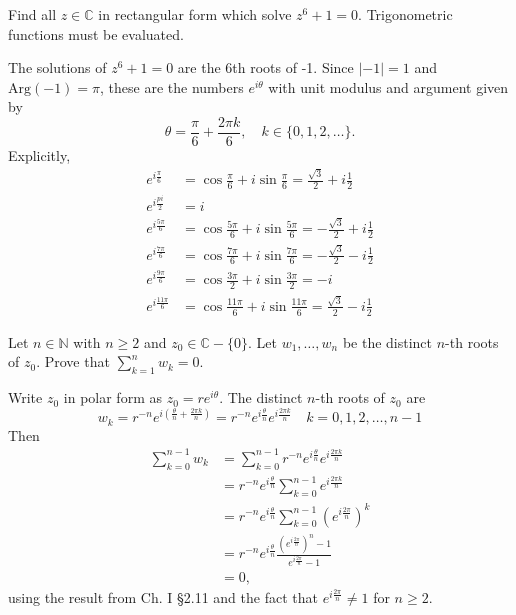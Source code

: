\documentclass{article}
\newcounter{Problem}
\newenvironment{Problem}{\begin{Exercise}[name={Problem},
                                          counter={Problem}]}
                        {\end{Exercise}}
\begin{document}
\begin{Problem}
Find all $z \in \mathbb{C}$ in rectangular form which solve
$z^6 + 1 = 0$. Trigonometric functions must be evaluated.
\end{Problem}

\begin{Answer}
The solutions of $z^6 + 1 = 0$ are the 6th roots of -1. Since $|-1| =
1$ and $\mathrm{Arg}(-1) = \pi$, these are the numbers $e^{i\theta}$ with unit
modulus and argument given by
$$
  \theta
= \frac{\pi}{6} + \frac{2 \pi k}{6},
\quad k \in \{ 0, 1, 2, \dots \}.
$$
Explicitly,
\begin{align*}
   e^{i\frac{\pi}{6}}
&= \cos \frac{\pi}{6} + i \sin \frac{\pi}{6}
 = \frac{\sqrt{3}}{2} + i \frac{1}{2} \\
   e^{i\frac{pi}{2}}
&= i \\
   e^{i\frac{5 \pi}{6}}
&= \cos \frac{5\pi}{6} + i \sin \frac{5\pi}{6}
 = -\frac{\sqrt{3}}{2} + i \frac{1}{2} \\
   e^{i\frac{7\pi}{6}}
&= \cos \frac{7\pi}{6} + i \sin \frac{7\pi}{6}
 = -\frac{\sqrt{3}}{2} - i \frac{1}{2} \\
   e^{i\frac{9\pi}{6}}
&= \cos \frac{3\pi}{2} + i \sin \frac{3\pi}{2}
 = -i \\
   e^{i\frac{11\pi}{6}}
&= \cos \frac{11\pi}{6} + i \sin \frac{11\pi}{6}
 = \frac{\sqrt{3}}{2} - i \frac{1}{2}
\end{align*}

\end{Answer}

\begin{Problem}
Let $n \in \mathbb{N}$ with $n \geq 2$ and
$z_0 \in \mathbb{C} - \{ 0 \}$.
Let $w_1, \dots, w_n$ be the distinct $n$-th roots of $z_0$.
Prove that $\sum_{k=1}^n w_k = 0$.
\end{Problem}

\begin{Answer}
Write $z_0$ in polar form as $z_0 = r e^{i \theta}$. The
distinct $n$-th roots of $z_0$ are
$$
  w_k
= r^{-n} e^{i\left(\frac{\theta}{n} + \frac{2 \pi k}{n}\right)}
= r^{-n} e^{i \frac{\theta}{n}} e^{i \frac{2 \pi k}{n}}
\quad k = 0, 1, 2, \dots, n-1
$$
Then
\begin{align*}
   \sum_{k = 0}^{n-1} w_k
&= \sum_{k=0}^{n-1} r^{-n} e^{i\frac{\theta}{n}} e^{i\frac{2 \pi k}{n}} \\
&= r^{-n} e^{i\frac{\theta}{n}} \sum_{k=0}^{n-1} e^{i\frac{2 \pi k}{n}} \\
&= r^{-n} e^{i\frac{\theta}{n}} \sum_{k=0}^{n-1} (e^{i\frac{2 \pi}{n}})^k \\
&= r^{-n} e^{i\frac{\theta}{n}} \frac{(e^{i\frac{2 \pi}{n}})^n -
  1}{e^{i \frac{2\pi}{n}} - 1} \\
&= 0,
\end{align*}
using the result from Ch. I \S 2.11 and the fact that
$e^{i \frac{2 \pi}{n}} \neq 1$ for $n \geq 2$.
\end{Answer}
\end{document}
